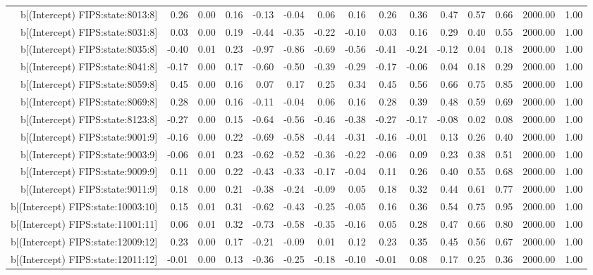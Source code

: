 \begin{table}[ht]
\begin{tabular}{rrrrrrrrrrrrrrr}
  b[(Intercept) FIPS:state:8013:8] & 0.26 & 0.00 & 0.16 & -0.13 & -0.04 & 0.06 & 0.16 & 0.26 & 0.36 & 0.47 & 0.57 & 0.66 & 2000.00 & 1.00 \\ 
  b[(Intercept) FIPS:state:8031:8] & 0.03 & 0.00 & 0.19 & -0.44 & -0.35 & -0.22 & -0.10 & 0.03 & 0.16 & 0.29 & 0.40 & 0.55 & 2000.00 & 1.00 \\ 
  b[(Intercept) FIPS:state:8035:8] & -0.40 & 0.01 & 0.23 & -0.97 & -0.86 & -0.69 & -0.56 & -0.41 & -0.24 & -0.12 & 0.04 & 0.18 & 2000.00 & 1.00 \\ 
  b[(Intercept) FIPS:state:8041:8] & -0.17 & 0.00 & 0.17 & -0.60 & -0.50 & -0.39 & -0.29 & -0.17 & -0.06 & 0.04 & 0.18 & 0.29 & 2000.00 & 1.00 \\ 
  b[(Intercept) FIPS:state:8059:8] & 0.45 & 0.00 & 0.16 & 0.07 & 0.17 & 0.25 & 0.34 & 0.45 & 0.56 & 0.66 & 0.75 & 0.85 & 2000.00 & 1.00 \\ 
  b[(Intercept) FIPS:state:8069:8] & 0.28 & 0.00 & 0.16 & -0.11 & -0.04 & 0.06 & 0.16 & 0.28 & 0.39 & 0.48 & 0.59 & 0.69 & 2000.00 & 1.00 \\ 
  b[(Intercept) FIPS:state:8123:8] & -0.27 & 0.00 & 0.15 & -0.64 & -0.56 & -0.46 & -0.38 & -0.27 & -0.17 & -0.08 & 0.02 & 0.08 & 2000.00 & 1.00 \\ 
  b[(Intercept) FIPS:state:9001:9] & -0.16 & 0.00 & 0.22 & -0.69 & -0.58 & -0.44 & -0.31 & -0.16 & -0.01 & 0.13 & 0.26 & 0.40 & 2000.00 & 1.00 \\ 
  b[(Intercept) FIPS:state:9003:9] & -0.06 & 0.01 & 0.23 & -0.62 & -0.52 & -0.36 & -0.22 & -0.06 & 0.09 & 0.23 & 0.38 & 0.51 & 2000.00 & 1.00 \\ 
  b[(Intercept) FIPS:state:9009:9] & 0.11 & 0.00 & 0.22 & -0.43 & -0.33 & -0.17 & -0.04 & 0.11 & 0.26 & 0.40 & 0.55 & 0.68 & 2000.00 & 1.00 \\ 
  b[(Intercept) FIPS:state:9011:9] & 0.18 & 0.00 & 0.21 & -0.38 & -0.24 & -0.09 & 0.05 & 0.18 & 0.32 & 0.44 & 0.61 & 0.77 & 2000.00 & 1.00 \\ 
  b[(Intercept) FIPS:state:10003:10] & 0.15 & 0.01 & 0.31 & -0.62 & -0.43 & -0.25 & -0.05 & 0.16 & 0.36 & 0.54 & 0.75 & 0.95 & 2000.00 & 1.00 \\ 
  b[(Intercept) FIPS:state:11001:11] & 0.06 & 0.01 & 0.32 & -0.73 & -0.58 & -0.35 & -0.16 & 0.05 & 0.28 & 0.47 & 0.66 & 0.80 & 2000.00 & 1.00 \\ 
  b[(Intercept) FIPS:state:12009:12] & 0.23 & 0.00 & 0.17 & -0.21 & -0.09 & 0.01 & 0.12 & 0.23 & 0.35 & 0.45 & 0.56 & 0.67 & 2000.00 & 1.00 \\ 
  b[(Intercept) FIPS:state:12011:12] & -0.01 & 0.00 & 0.13 & -0.36 & -0.25 & -0.18 & -0.10 & -0.01 & 0.08 & 0.17 & 0.25 & 0.36 & 2000.00 & 1.00 \\ 

\end{tabular}
\end{table}
